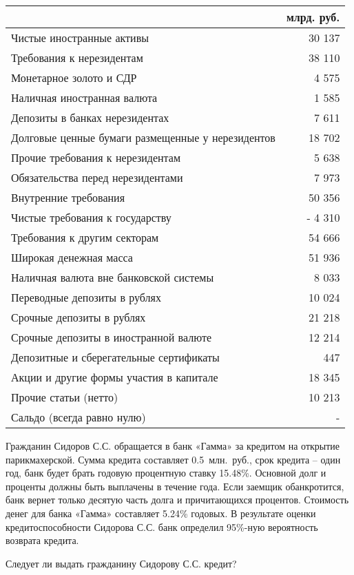 \documentclass[12pt, table]{exam}
\begin{document}
\begin{questions}
\begin{solution}[6em]
	\small
	\begin{tabularx}{\linewidth}[b]{@{}>{\raggedright\arraybackslash}Xr@{}}				& млрд. руб.\\
		\toprule
		Чистые иностранные активы &    30 137    \\
		\midrule
		Требования к нерезидентам &    38 110    \\
		Монетарное золото и СДР &      4 575    \\
		Наличная иностранная валюта &      1 585    \\
		Депозиты в банках нерезидентах &      7 611    \\
		Долговые ценные бумаги размещенные у нерезидентов &    18 702    \\
		Прочие требования к нерезидентам &      5 638    \\
		Обязательства перед нерезидентами &      7 973    \\
		\midrule
		Внутренние требования &    50 356    \\
		Чистые требования к государству & -   4 310    \\
		Требования к другим секторам &    54 666    \\
		\midrule
		Широкая денежная масса &    51 936    \\
		Наличная валюта вне банковской системы &      8 033    \\
		Переводные депозиты в рублях &    10 024    \\
		Срочные депозиты в рублях &    21 218    \\
		Срочные депозиты в иностранной валюте &    12 214    \\
		Депозитные и сберегательные сертификаты &         447    \\
		\midrule
		Акции и другие формы участия в капитале &    18 345    \\
		\midrule
		Прочие статьи (нетто) &    10 213    \\
		\midrule
		Сальдо (всегда равно нулю) &           -      \\
		\bottomrule
	\end{tabularx}%
	\normalsize
	
\end{solution}

\pagebreak
\question[20] Гражданин Сидоров С.С. обращается в банк «Гамма» за кредитом на открытие парикмахерской. Сумма кредита составляет 0.5~млн.~руб., срок кредита – один год, банк будет брать годовую процентную ставку 15.48\%. Основной долг и проценты должны быть выплачены в течение года. Если заемщик обанкротится, банк вернет только десятую часть долга и причитающихся процентов. Стоимость денег для банка «Гамма» составляет 5.24\% годовых.  В результате оценки кредитоспособности Сидорова С.С. банк определил 95\%-ную вероятность возврата кредита.
\noaddpoints
\begin{subparts}
\subpart[10] Следует ли выдать гражданину Сидорову С.С. кредит?


\end{subparts}
\end{questions}
\end{document}
